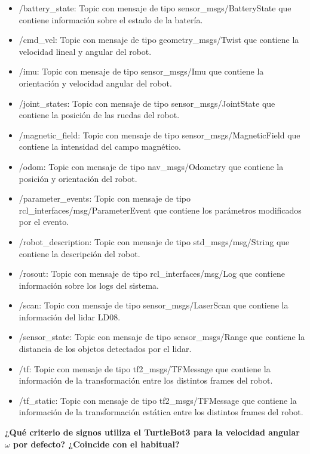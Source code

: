 \documentclass[a4paper,12pt]{article}
\begin{document}
{\begin{itemize}
  \item /battery\_state: Topic con mensaje de tipo sensor\_msgs/BatteryState que contiene información sobre el estado de la batería.
  \item /cmd\_vel: Topic con mensaje de tipo geometry\_msgs/Twist que contiene la velocidad lineal y angular del robot.
  \item /imu: Topic con mensaje de tipo sensor\_msgs/Imu que contiene la orientación y velocidad angular del robot.
  \item /joint\_states: Topic con mensaje de tipo sensor\_msgs/JointState que contiene la posición de las ruedas del robot.
  \item /magnetic\_field: Topic con mensaje de tipo sensor\_msgs/MagneticField que contiene la intensidad del campo magnético.
  \item /odom: Topic con mensaje de tipo nav\_msgs/Odometry que contiene la posición y orientación del robot.
  \item /parameter\_events: Topic con mensaje de tipo rcl\_interfaces/msg/ParameterEvent que contiene los parámetros
  modificados por el evento.
  \item /robot\_description: Topic con mensaje de tipo std\_msgs/msg/String que contiene la descripción del robot.
  \item /rosout: Topic con mensaje de tipo rcl\_interfaces/msg/Log que contiene información sobre los logs del sistema.
  \item /scan: Topic con mensaje de tipo sensor\_msgs/LaserScan que contiene la información del lidar LD08.
  \item /sensor\_state: Topic con mensaje de tipo sensor\_msgs/Range que contiene la distancia de los objetos 
  detectados por el lidar.
  \item /tf: Topic con mensaje de tipo tf2\_msgs/TFMessage que contiene la información de la transformación entre
  los distintos frames del robot.
  \item /tf\_static: Topic con mensaje de tipo tf2\_msgs/TFMessage que contiene la información de la transformación
  estática entre los distintos frames del robot.
\end{itemize}

\vspace{1cm}


\textbf{¿Qué criterio de signos utiliza el TurtleBot3 para la velocidad angular $\omega$ por defecto? ¿Coincide con el habitual?}


}
\end{document}
